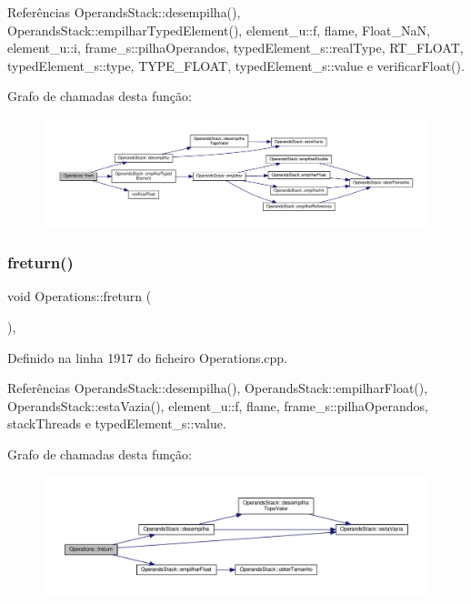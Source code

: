 Referências Operands\+Stack\+::desempilha(), Operands\+Stack\+::empilhar\+Typed\+Element(), element\+\_\+u\+::f, flame, Float\+\_\+\+NaN, element\+\_\+u\+::i, frame\+\_\+s\+::pilha\+Operandos, typed\+Element\+\_\+s\+::real\+Type, R\+T\+\_\+\+F\+L\+O\+AT, typed\+Element\+\_\+s\+::type, T\+Y\+P\+E\+\_\+\+F\+L\+O\+AT, typed\+Element\+\_\+s\+::value e verificar\+Float().

Grafo de chamadas desta função\+:
\nopagebreak
\begin{figure}[H]
\begin{center}
\leavevmode
\includegraphics[width=350pt]{classOperations_ad29eac4f222e4b74667086c3da0d5538_cgraph}
\end{center}
\end{figure}
\mbox{\label{classOperations_a701431fe6d5d20fafa747dbeae90e1d4}} 
\subsubsection{\texorpdfstring{freturn()}{freturn()}}
{\footnotesize\ttfamily void Operations\+::freturn (\begin{DoxyParamCaption}{ }\end{DoxyParamCaption})\hspace{0.3cm}{\ttfamily [static]}, {\ttfamily [private]}}



Definido na linha 1917 do ficheiro Operations.\+cpp.



Referências Operands\+Stack\+::desempilha(), Operands\+Stack\+::empilhar\+Float(), Operands\+Stack\+::esta\+Vazia(), element\+\_\+u\+::f, flame, frame\+\_\+s\+::pilha\+Operandos, stack\+Threads e typed\+Element\+\_\+s\+::value.

Grafo de chamadas desta função\+:
\nopagebreak
\begin{figure}[H]
\begin{center}
\leavevmode
\includegraphics[width=350pt]{classOperations_a701431fe6d5d20fafa747dbeae90e1d4_cgraph}
\end{center}
\end{figure}
\mbox{\label{classOperations_a42a0b3220b593059320cf7d5a5eed6e2}} 
